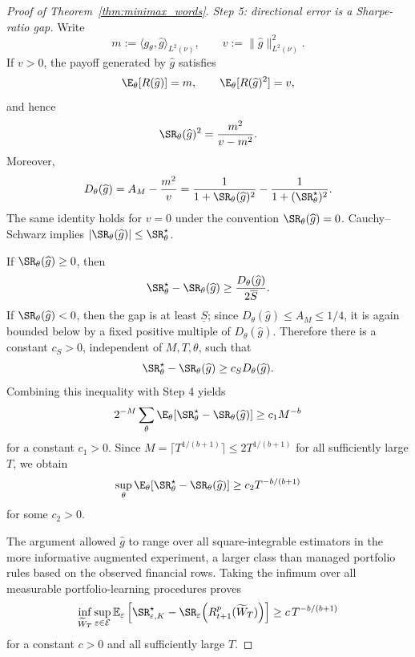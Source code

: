 \begin{proof}[Proof of Theorem~\ref{thm:minimax_words}]
\medskip
\noindent\textit{Step 5: directional error is a Sharpe-ratio gap.}
Write
\[
m:=\langle g_\theta,\widehat g\rangle_{L^2(\nu)},
\qquad
v:=\|\widehat g\|_{L^2(\nu)}^2.
\]
If $v>0$, the payoff generated by $\widehat g$ satisfies
\[
\E_\theta[R(\widehat g)]=m,
\qquad
\E_\theta[R(\widehat g)^2]=v,
\]
and hence
\[
\SR_\theta(\widehat g)^2
=
\frac{m^2}{v-m^2}.
\]
Moreover,
\[
D_\theta(\widehat g)
=
A_M-\frac{m^2}{v}
=
\frac{1}{1+\SR_\theta(\widehat g)^2}
-
\frac{1}{1+(\SR_\theta^\star)^2}.
\]
The same identity holds for $v=0$ under the convention
$\SR_\theta(\widehat g)=0$. Cauchy--Schwarz implies
$|\SR_\theta(\widehat g)|\leq\SR_\theta^\star$.

If $\SR_\theta(\widehat g)\geq0$, then
\[
\SR_\theta^\star-\SR_\theta(\widehat g)
\geq
\frac{D_\theta(\widehat g)}{2\overline S}.
\]
If $\SR_\theta(\widehat g)<0$, then the gap is at least $\underline S$;
since $D_\theta(\widehat g)\leq A_M\leq1/4$, it is again bounded below by
a fixed positive multiple of $D_\theta(\widehat g)$. Therefore there is a
constant $c_S>0$, independent of $M,T,\theta$, such that
\[
\SR_\theta^\star-\SR_\theta(\widehat g)
\geq
c_S D_\theta(\widehat g).
\]
Combining this inequality with Step 4 yields
\[
2^{-M}\sum_\theta
\E_\theta\!\left[
\SR_\theta^\star-\SR_\theta(\widehat g)
\right]
\geq
c_1M^{-b}
\]
for a constant $c_1>0$. Since
$M=\lceil T^{1/(b+1)}\rceil\leq2T^{1/(b+1)}$ for all sufficiently large
$T$, we obtain
\[
\sup_\theta
\E_\theta\!\left[
\SR_\theta^\star-\SR_\theta(\widehat g)
\right]
\geq
c_2T^{-b/(b+1)}
\]
for some $c_2>0$.

The argument allowed $\widehat g$ to range over all square-integrable
estimators in the more informative augmented experiment, a larger class than
managed portfolio rules based on the observed financial rows. Taking the
infimum over all measurable portfolio-learning procedures proves
\[
\inf_{\widetilde W_T}
\sup_{\varepsilon\in\mathcal E}
\mathbb E_\varepsilon
\left[
\SR^\star_{\varepsilon,K}
-
\SR_\varepsilon\!\left(R^p_{t+1}(\widetilde W_T)\right)
\right]
\geq
c\,T^{-b/(b+1)}
\]
for a constant $c>0$ and all sufficiently large $T$.
\end{proof}
